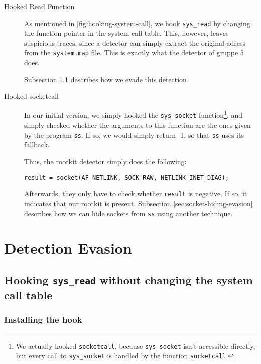 \documentclass[10pt, letterpaper]{article}
\begin{document}
\begin{description}
\item[Hooked Read Function] As mentioned in \autoref{fig:hooking-system-call}, we hook \texttt{sys\_read} by changing the function pointer in the system call table. This, however, leaves suspicious traces, since a detector can simply extract the original adress from the \texttt{system.map} file. This is exactly what the detector of gruppe 5 does.

Subsection \ref{sec:hooking-read-2} describes how we evade this detection.
\item[Hooked socketcall] In our initial version, we simply hooked the \texttt{sys\_socket} function\footnote{We actually hooked \texttt{socketcall}, because \texttt{sys\_socket} isn't accessible directly, but every call to \texttt{sys\_socket} is handled by the function \texttt{socketcall}.}, and simply checked whether the arguments to this function are the ones given by the program \texttt{ss}. If so, we would simply return -1, so that \texttt{ss} uses its fallback.

Thus, the rootkit detector simply does the following:

\begin{verbatim}
result = socket(AF_NETLINK, SOCK_RAW, NETLINK_INET_DIAG);
\end{verbatim}

Afterwards, they only have to check whether \texttt{result} is negative. If so, it indicates that our rootkit is present. Subsection \ref{sec:socket-hiding-evasion} describes how we can hide sockets from \texttt{ss} using another technique.

\end{description}

\section{Detection Evasion}
\label{sec:detection-evasion}

\subsection{Hooking \texttt{sys\_read} without changing the system call table}
\label{sec:hooking-read-2}

\subsubsection{Installing the hook}
\label{sec:hooking-read-install-hook}
\end{document}
